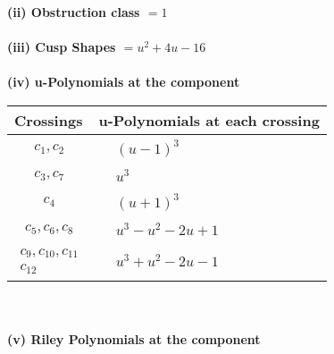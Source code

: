 \documentclass[1p]{elsarticle_modified}
\theoremstyle{definition}
\begin{document}
\flushleft \textbf{(ii) Obstruction class $= 1$}\\~\\
\flushleft \textbf{(iii) Cusp Shapes $= u^2+4 u-16$}\\~\\
\newpage\renewcommand{\arraystretch}{1}
\flushleft \textbf{(iv) u-Polynomials at the component}\newline \\
\begin{tabular}{m{50pt}|m{274pt}}
Crossings & \hspace{64pt}u-Polynomials at each crossing \\
\hline $$\begin{aligned}c_{1},c_{2}\end{aligned}$$&$\begin{aligned}
&(u-1)^3
\end{aligned}$\\
\hline $$\begin{aligned}c_{3},c_{7}\end{aligned}$$&$\begin{aligned}
&u^3
\end{aligned}$\\
\hline $$\begin{aligned}c_{4}\end{aligned}$$&$\begin{aligned}
&(u+1)^3
\end{aligned}$\\
\hline $$\begin{aligned}c_{5},c_{6},c_{8}\end{aligned}$$&$\begin{aligned}
&u^3- u^2-2 u+1
\end{aligned}$\\
\hline $$\begin{aligned}c_{9},c_{10},c_{11}\\c_{12}\end{aligned}$$&$\begin{aligned}
&u^3+u^2-2 u-1
\end{aligned}$\\
\hline
\end{tabular}\\~\\
\newpage\renewcommand{\arraystretch}{1}
\flushleft \textbf{(v) Riley Polynomials at the component}\newline \\
\end{document}
